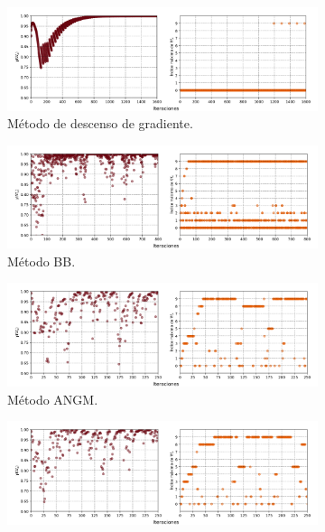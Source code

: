 \begin{figure}[H]
    \begin{subfigure}{8.4cm}
        \includegraphics[width=1\textwidth]{graphics/gamma/steepest.png}
        \caption{Método de descenso de gradiente.}
    \end{subfigure}
    \begin{subfigure}{8.4cm}
        \includegraphics[width=1\textwidth]{graphics/gamma/barzilai.png}
        \caption{Método BB.}
    \end{subfigure}
    \begin{subfigure}{8.4cm}
        \includegraphics[width=1\textwidth]{graphics/gamma/ANGM.png}
        \caption{Método ANGM.}
    \end{subfigure}
    \begin{subfigure}{8.4cm}
        \includegraphics[width=1\textwidth]{graphics/gamma/ANGR1.png}

\end{subfigure}
\end{figure}
